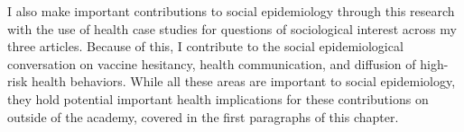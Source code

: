 I also make important contributions to social epidemiology through this research
with the use of health case studies for questions of sociological interest
across my three articles. Because of this, I contribute to the social
epidemiological conversation on vaccine hesitancy, health communication, and
diffusion of high-risk health behaviors. While all these areas are important to
social epidemiology, they hold potential important health implications for these
contributions on outside of the academy, covered in the first paragraphs of this
chapter.

